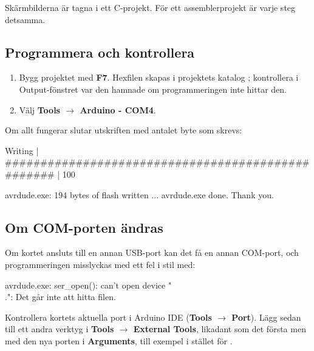 Skärmbilderna är tagna i ett C-projekt. För ett assemblerprojekt är varje steg detsamma.

\subsection{Programmera och kontrollera}
\label{studio:5-5}
\begin{enumerate}
  \item Bygg projektet med \textbf{F7}. Hexfilen skapas i projektets katalog ;
    kontrollera i Output-fönstret var den hamnade om programmeringen inte hittar den.
  \item Välj \textbf{Tools $\rightarrow$ Arduino - COM4}.
\end{enumerate}


Om allt fungerar slutar utskriften med antalet byte som skrevs:

\begin{console}
Writing | ################################################## | 100%

avrdude.exe: 194 bytes of flash written
...
avrdude.exe done. Thank you.
\end{console}


\subsection{Om COM-porten ändras}
\label{studio:5-6}
Om kortet ansluts till en annan USB-port kan det få en annan COM-port, och programmeringen
misslyckas med ett fel i stil med:

\begin{textdrawing}
avrdude.exe: ser_open(): can't open device "\\.": Det går inte att hitta filen.
\end{textdrawing}

Kontrollera kortets aktuella port i Arduino IDE (\textbf{Tools $\rightarrow$ Port}). Lägg sedan
till ett andra verktyg i \textbf{Tools $\rightarrow$ External Tools}, likadant som det första men
med den nya porten i \textbf{Arguments}, till exempel  i stället för .

